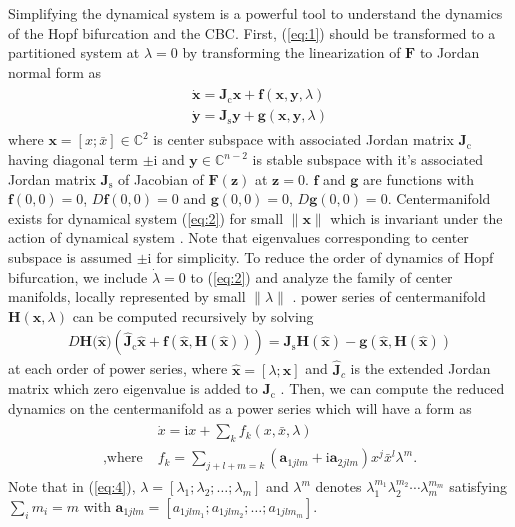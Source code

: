 \documentclass[openacc]{rsproca_new}%
\def\complex{\mathbb{C}}
\def\vec#1{\ensuremath{\mathbf{#1}}}
\newcommand{\Eref}[1]{(\ref{#1})}
\begin{document}
Simplifying the dynamical system is a powerful tool to understand the dynamics of the Hopf bifurcation and the CBC. First, \Eref{eq:1} should be transformed to a partitioned system at \(\lambda=0\) by transforming the linearization of \(\vec{F}\) to Jordan normal form as
\begin{align}\label{eq:2}
  \begin{split}
    \dot{\vec{x}} =\vec{J}_\textrm{c} \vec{x} + \vec{f}(\vec{x},\vec{y},\lambda)\\
    \dot{\vec{y}} =\vec{J}_\textrm{s} \vec{y} +\vec{g}(\vec{x},\vec{y},\lambda)
  \end{split}
\end{align}
where $\vec{x}=[x;\bar{x}]\in \complex^2$ is center subspace with associated Jordan matrix $\vec{J}_\textrm{c}$ having diagonal term $\pm\textrm{i}$ and $\vec{y}\in \complex^{n-2}$ is stable subspace with it's associated Jordan matrix $\vec{J}_\textrm{s}$ of Jacobian of $\vec{F}(\vec{z})$ at $\vec{z}=0$.
$\vec{f}$ and $\vec{g}$ are functions with $\vec{f}(0,0)=0$, $D\vec{f}(0,0)=0$ and $\vec{g}(0,0)=0$, $D\vec{g}(0,0)=0$. Centermanifold exists for dynamical system \Eref{eq:2} for small  $\|\vec{x}\|$ which is invariant under the action of dynamical system \cite{carr2012applications}. Note that eigenvalues corresponding to center subspace is assumed $\pm\textrm{i}$ for simplicity. To reduce the order of dynamics of Hopf bifurcation, we include $\dot\lambda=0$ to \Eref{eq:2} and analyze the family of center manifolds, locally represented by small $\|\lambda\|$  \cite{kuznetsov2013elements}. power series of centermanifold $\vec{H}(\vec{x},\lambda)$ can be computed recursively by solving
\begin{align}\label{eq:3}
    D\vec{H}({\vec{\hat{x})}}(\vec{\hat{J}}_\textrm{c}\vec{\hat{x}}+\vec{f}(\vec{\hat{x}},\vec{H}(\vec{\hat{x}}))) =\vec{J}_\textrm{s} \vec{H}(\vec{\hat{x}})-\vec{g}(\vec{\hat{x}},\vec{H}(\vec{\hat {x}}))
\end{align}
at each order of power series, where \(\vec{\hat{x}}=[\lambda;\vec{x}]\) and \(\vec{\hat{J}}_c\) is the extended Jordan matrix which zero eigenvalue is added to \(\vec{J}_\textrm{c}\) \cite{bi1999symbolic}. Then, we can compute the reduced dynamics on the centermanifold as a power series which will have a form as
\begin{align}\label{eq:4}
  \begin{split}
    {}&\dot{x} =\textrm{i} x+\sum_k f_k(x,\bar{x},\lambda)\\
    ,\textrm{where} \; & f_k=\sum_{j+l+m=k}(\vec{a}_{1jlm}+\textrm{i}\vec{a}_{2jlm})x^j\bar{x}^l\lambda^m.
  \end{split}
\end{align}
Note that in \Eref{eq:4}, \(\lambda=[\lambda_1;\lambda_2;\ldots;\lambda_m]\) and \(\lambda^m\) denotes \(\lambda_1^{m_1}\lambda_2^{m_2}\cdots\lambda_m^{m_m}\) satisfying \(\sum_i m_i = m\) with \(\vec{a}_{1jlm}=[a_{1jlm_1};a_{1jlm_2};\ldots;a_{1jlm_m}]\).
\end{document}
